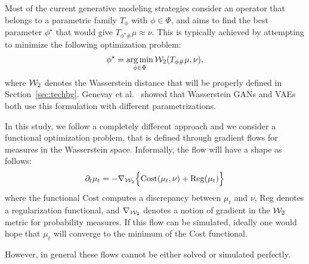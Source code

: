 Most of the current generative modeling strategies consider an operator that belongs to a parametric family $T_{\phi}$ with $\phi \in \Phi$, and aims to find the best parameter $\phi^\star$ that would give $T_{\phi^\star \#}\mu \approx \nu$. This is typically achieved by attempting to minimize the following optimization problem:
\begin{align}
\phi^\star = \operatorname*{arg\min}_{\phi \in \Phi} {\cal W}_2(T_{\phi \#}\mu, \nu),
\end{align}
where ${\cal W}_2$ denotes the Wasserstein distance that will be properly defined in Section~\ref{sec:techbg}. Genevay et al.\ \cite{genevay2017gan} showed that Wasserstein GANs and VAEs both use this formulation with different parametrizations. 

In this study, we follow a completely different approach and we consider a functional optimization problem, that is defined through gradient flows for measures in the Wasserstein space. Informally, the flow will have a shape as follows:
\begin{align}
\partial_t \mu_t = - \nabla_{{\cal W}_2} \Bigl\{ \mathrm{Cost}(\mu_t, \nu) + \mathrm{Reg}(\mu_t)\Bigr\} \label{eqn:gradflow}
\end{align}
where the functional $\mathrm{Cost}$ computes a discrepancy between $\mu_t$ and $\nu$, $\mathrm{Reg}$ denotes a regularization functional, and $\nabla_{{\cal W}_2}$ denotes a notion of gradient in the ${\cal W}_2$ metric for probability measures. If this flow can be simulated, ideally one would hope that $\mu_t$ will converge to the minimum of the Cost functional.

However, in general these flows cannot be either solved or simulated perfectly. 
